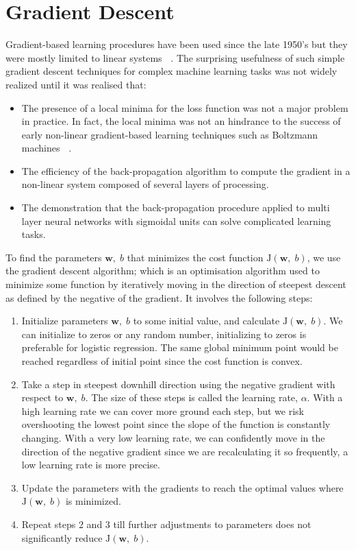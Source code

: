 \documentclass[12pt]{report}
\numberwithin{equation}{section}
\begin{document}
\section{Gradient Descent}\label{sec:gd}
Gradient-based learning procedures have been used since the late 1950's but they were mostly limited to linear systems \textbf{~\cite{dudaHart1973}}. The surprising usefulness of such simple gradient descent techniques for complex machine learning tasks was not widely realized until it was realised that:
\begin{itemize}[label = -]
\item The presence of a local minima for the loss function was not a major problem in practice. In fact, the local minima was not an hindrance to the  success of early non-linear gradient-based learning techniques such as Boltzmann machines \textbf{~\cite{ahs-labm-85}}.
\item The efficiency of the back-propagation algorithm to compute the gradient in a non-linear system composed of several layers of processing.
\item The demonstration that the back-propagation procedure applied to multi layer neural networks with sigmoidal units can solve complicated learning tasks.
\end{itemize}
To find the parameters $\bm{w},\;b$ that minimizes the cost function $\mathrm{J}(\bm{w},\;b)$, we use the gradient descent algorithm; which is an optimisation algorithm used to minimize some function by iteratively moving in the direction of steepest descent as defined by the negative of the gradient. It involves the following steps:
\begin{enumerate}
\item Initialize parameters $\bm{w},\; b$ to some initial value, and calculate $\mathrm{J}(\bm{w},\;b)$. We can initialize to zeros or any random number, initializing to zeros is preferable for logistic regression. The same global minimum point would be reached regardless of initial point since the cost function is convex. 
\item Take a step in steepest downhill direction using the negative gradient with respect to $\bm{w}, \; b$. The size of these steps is called the learning rate, $\alpha$. With a high learning rate we can cover more ground each step, but we risk overshooting the lowest point since the slope of the function is constantly changing. With a very low learning rate, we can confidently move in the direction of the negative gradient since we are recalculating it so frequently, a low learning rate is more precise. 
\item Update the parameters with the gradients to reach the optimal values where $\mathrm{J}(\bm{w},\;b)$ is minimized.
\item Repeat steps 2 and 3 till further adjustments to parameters does not significantly reduce $\mathrm{J}(\bm{w},\;b)$.
\end{enumerate}
\end{document}

